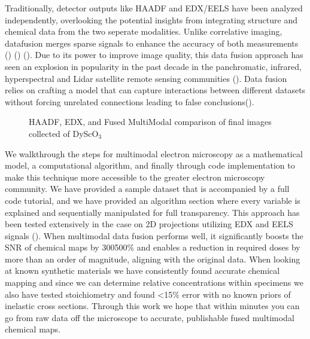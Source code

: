 \documentclass[letterpaper,10pt,english]{jupyterBook}
\let\sphinxpxdimen\pdfpxdimen\else\newdimen\sphinxpxdimen
\begin{document}
\sphinxAtStartPar
Traditionally, detector outputs like HAADF and EDX/EELS have been analyzed independently, overlooking the potential insights from integrating structure and chemical data from the two seperate modalities. Unlike correlative imaging, data\sphinxhyphen{}fusion merges sparse signals to enhance the accuracy of both measurements () () (). Due to its power to improve image quality, this data fusion approach has seen an explosion in popularity in the past decade in the panchromatic, infrared, hyperspectral and Lidar satellite remote sensing communities ().  Data fusion relies on crafting a model that can capture interactions between different datasets without forcing unrelated connections leading to false conclusions().

\begin{figure}[htbp]
\centering
\capstart

\noindent\sphinxincludegraphics[width=700\sphinxpxdimen]{{Figure_0_comparison}.png}
\caption{HAADF, EDX, and Fused Multi\sphinxhyphen{}Modal comparison of final images collected of DyScO\(_3\)}\label{\detokenize{01_intro:fig-overview}}\end{figure}

\sphinxAtStartPar
We walkthrough the steps for multi\sphinxhyphen{}modal electron microscopy as a mathematical model, a computational algorithm, and finally through code implementation to make this technique more accessible to the greater electron microscopy community.  We have provided a sample dataset that is accompanied by a full code tutorial, and we have provided an algorithm section where every variable is explained and sequentially manipulated for full transparency. This approach has been tested extensively in the case on 2D projections utilizing EDX and EELS signals (). When multi\sphinxhyphen{}modal data fusion performs well, it significantly boosts the SNR of chemical maps by 300\sphinxhyphen{}500\% and enables a reduction in required doses by more than an order of magnitude, aligning with the original data. When looking at known synthetic materials we have consistently found accurate chemical mapping and since we can determine relative concentrations within specimens we also have tested stoichiometry and found <15\% error with no known priors of inelastic cross sections. Through this work we hope that within minutes you can go from raw data off the microscope to accurate, publishable fused multi\sphinxhyphen{}modal chemical maps.
\end{document}
